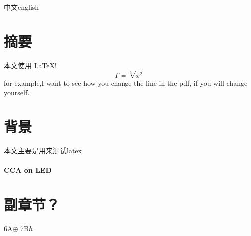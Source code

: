 \documentclass{article}
\begin{document}
	中文english
	\section{摘要}
	本文使用 \LaTeX!  $$ \Gamma=\sqrt[3]{x^2} $$
	for example,I want to see how you change the line in the pdf, if you will change yourself.
	\section{背景}
	本文主要是用来测试latex
	
	\paragraph{CCA on LED}\section*{副章节？}
	6A$\oplus$ 7B$\hbar$
\end{document}
